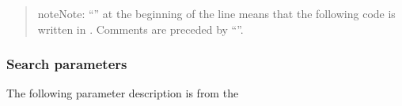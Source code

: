 \documentclass[a4paper,12pt,english]{sphinxhowto}
\begin{document}
\begin{quote}

\begin{sphinxadmonition}{note}{Note:}
“” at the beginning of the line means that the following code is
written in . Comments are preceded by “\sphinxcode{\sphinxupquote{\#}}”.
\end{sphinxadmonition}
\end{quote}



\subsubsection{Search parameters}
\label{\detokenize{Epigraphic:search-parameters}}
The following parameter description is from the 
\end{document}
